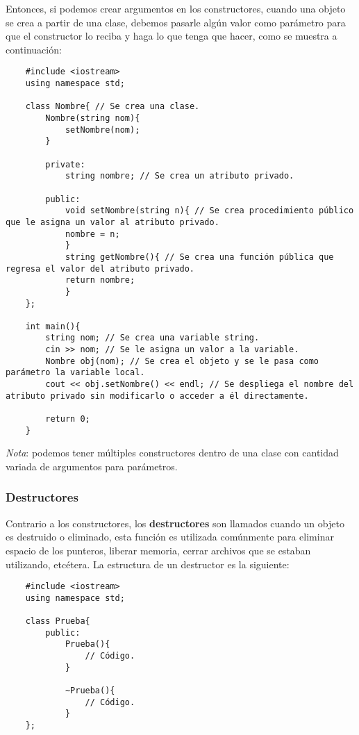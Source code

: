 Entonces, si podemos crear argumentos en los constructores, cuando una objeto se crea a partir de una clase, debemos pasarle algún valor como parámetro para que el constructor lo reciba y haga lo que tenga que hacer, como se muestra a continuación:
\begin{lstlisting}
    #include <iostream>
    using namespace std;

    class Nombre{ // Se crea una clase.
        Nombre(string nom){
            setNombre(nom);
        }
        
        private:
            string nombre; // Se crea un atributo privado.
        
        public:
            void setNombre(string n){ // Se crea procedimiento público que le asigna un valor al atributo privado.
            nombre = n;
            }
            string getNombre(){ // Se crea una función pública que regresa el valor del atributo privado.
            return nombre;
            }
    };
    
    int main(){
        string nom; // Se crea una variable string.
        cin >> nom; // Se le asigna un valor a la variable.
        Nombre obj(nom); // Se crea el objeto y se le pasa como parámetro la variable local.
        cout << obj.setNombre() << endl; // Se despliega el nombre del atributo privado sin modificarlo o acceder a él directamente.
        
        return 0;
    }
\end{lstlisting}

\textit{Nota}: podemos tener múltiples constructores dentro de una clase con cantidad variada de argumentos para parámetros.


\subsubsection{Destructores}

Contrario a los constructores, los \textbf{destructores} son llamados cuando un objeto es destruido o eliminado, esta función es utilizada comúnmente para eliminar espacio de los punteros, liberar memoria, cerrar archivos que se estaban utilizando, etcétera. La estructura de un destructor es la siguiente:
\begin{lstlisting}
    #include <iostream>
    using namespace std;

    class Prueba{
        public:
            Prueba(){
                // Código.
            }
            
            ~Prueba(){
                // Código.
            }
    };
\end{lstlisting}

